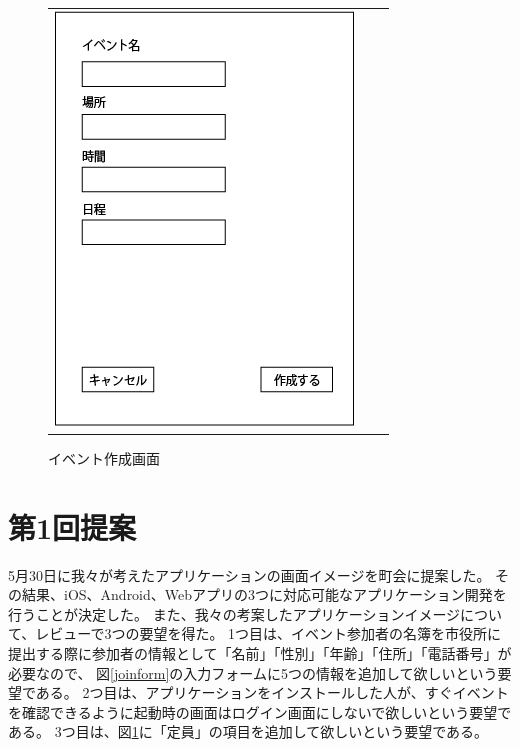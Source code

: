 \begin{figure}[h]
\begin{tabular}{ccc}
\begin{minipage}[t]{0.33\hsize}
        \caption{参加フォーム画面}
        \label{joinform}
      \end{minipage}
      \begin{minipage}[t]{0.33\hsize}
        \centering
        \includegraphics[keepaspectratio, scale=0.4]{process_figures/old_create_event.png}
        \caption{イベント作成画面}
        \label{create_event.old}
      \end{minipage}
    \end{tabular}
\end{figure}

\section{第1回提案}
\label{first_review}
5月30日に我々が考えたアプリケーションの画面イメージを町会に提案した。
その結果、iOS、Android、Webアプリの3つに対応可能なアプリケーション開発を行うことが決定した。
また、我々の考案したアプリケーションイメージについて、レビューで3つの要望を得た。
1つ目は、イベント参加者の名簿を市役所に提出する際に参加者の情報として「名前」「性別」「年齢」「住所」「電話番号」が必要なので、
図\ref{joinform}の入力フォームに5つの情報を追加して欲しいという要望である。
2つ目は、アプリケーションをインストールした人が、すぐイベントを確認できるように起動時の画面はログイン画面にしないで欲しいという要望である。
3つ目は、図\ref{create_event.old}に「定員」の項目を追加して欲しいという要望である。

